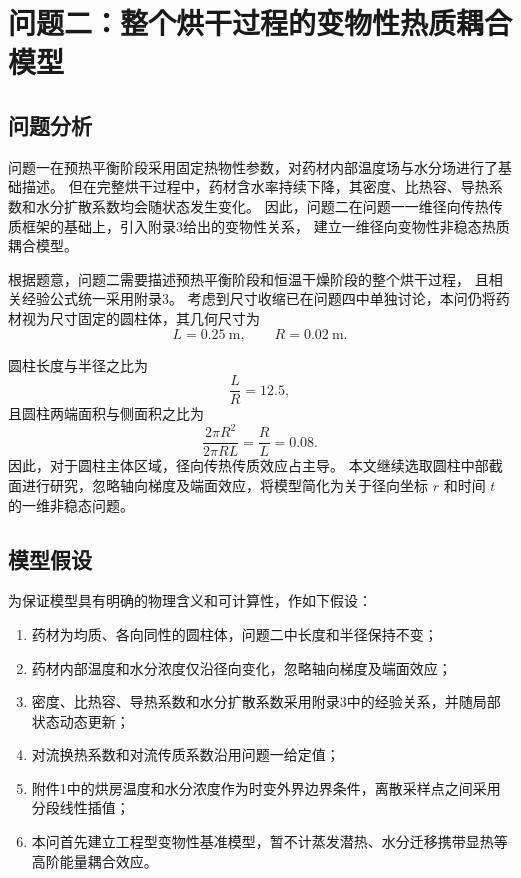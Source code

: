 \documentclass[UTF8,a4paper,12pt]{ctexart}
\begin{document}
\section{问题二：整个烘干过程的变物性热质耦合模型}

\subsection{问题分析}

问题一在预热平衡阶段采用固定热物性参数，对药材内部温度场与水分场进行了基础描述。
但在完整烘干过程中，药材含水率持续下降，其密度、比热容、导热系数和水分扩散系数均会随状态发生变化。
因此，问题二在问题一一维径向传热传质框架的基础上，引入附录3给出的变物性关系，
建立一维径向变物性非稳态热质耦合模型。

根据题意，问题二需要描述预热平衡阶段和恒温干燥阶段的整个烘干过程，
且相关经验公式统一采用附录3。
考虑到尺寸收缩已在问题四中单独讨论，本问仍将药材视为尺寸固定的圆柱体，其几何尺寸为
\begin{equation}
L=0.25~\mathrm{m},\qquad R=0.02~\mathrm{m}.
\end{equation}

圆柱长度与半径之比为
\begin{equation}
\frac{L}{R}=12.5,
\end{equation}
且圆柱两端面积与侧面积之比为
\begin{equation}
\frac{2\pi R^2}{2\pi RL}=\frac{R}{L}=0.08.
\end{equation}
因此，对于圆柱主体区域，径向传热传质效应占主导。
本文继续选取圆柱中部截面进行研究，忽略轴向梯度及端面效应，将模型简化为关于径向坐标
$r$ 和时间 $t$ 的一维非稳态问题。

\subsection{模型假设}

为保证模型具有明确的物理含义和可计算性，作如下假设：

\begin{enumerate}
  \item 药材为均质、各向同性的圆柱体，问题二中长度和半径保持不变；
  \item 药材内部温度和水分浓度仅沿径向变化，忽略轴向梯度及端面效应；
  \item 密度、比热容、导热系数和水分扩散系数采用附录3中的经验关系，并随局部状态动态更新；
  \item 对流换热系数和对流传质系数沿用问题一给定值；
  \item 附件1中的烘房温度和水分浓度作为时变外界边界条件，离散采样点之间采用分段线性插值；
  \item 本问首先建立工程型变物性基准模型，暂不计蒸发潜热、水分迁移携带显热等高阶能量耦合效应。
\end{enumerate}
\end{document}
